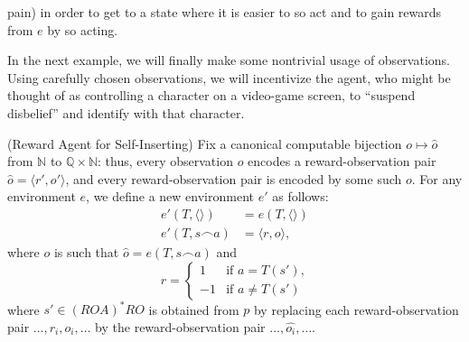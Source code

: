 \documentclass[runningheads]{llncs}
\begin{document}
\begin{example}
\begin{itemize}
        pain) in order to get to a state where it is easier to so act and
        to gain rewards from $e$ by so acting.
    \end{itemize}
\end{example}

In the next example,
we will finally make some nontrivial usage of observations. Using carefully chosen
observations, we will incentivize the agent, who might be thought of as
controlling a character on a video-game screen,
to ``suspend disbelief'' and identify with that character.

\begin{example}
\label{selfinsertionexample}
    (Reward Agent for Self-Inserting)
    Fix a canonical computable bijection
    $o\mapsto \hat o$
    from $\mathbb N$ to $\mathbb Q\times \mathbb N$:
    thus, every observation $o$ encodes a reward-observation pair
    $\hat o = \langle r',o'\rangle$, and every reward-observation pair
    is encoded by some such $o$.
    For any environment $e$, we define
    a new environment $e'$ as follows:
    \begin{align*}
        e'(T,\langle\rangle) &= e(T,\langle\rangle)\\
        e'(T,s\frown a) &= \langle r,o\rangle,
    \end{align*}
    where $o$ is such that $\hat o = e(T,s\frown a)$ and
    \[
        r =
        \begin{cases}
            1 & \mbox{if $a=T(s')$,}\\
            -1 & \mbox{if $a\not=T(s')$}
        \end{cases}
    \]
    where
    $s'\in (ROA)^*RO$ is obtained from $p$
    by replacing each reward-observation pair
    $\ldots,r_i,o_i,\ldots$ by the reward-observation
    pair $\ldots,\widehat{o_i},\ldots$.
\end{example}
\end{document}

